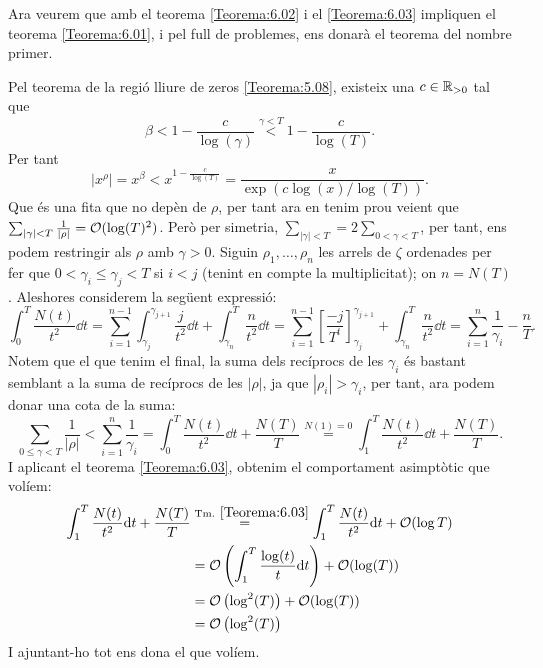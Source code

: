 Ara veurem que amb el teorema \ref{Teorema:6.02} i el \ref{Teorema:6.03} impliquen el teorema \ref{Teorema:6.01}, i pel full de problemes, ens donarà el teorema del nombre primer.
\begin{pf}
    Pel teorema de la regió lliure de zeros \ref{Teorema:5.08}, existeix una $c\in\mathbb R_{>0}$ tal que
    \[
        \beta<1-\frac{c}{\log(\gamma)}\overset{\gamma<T}{<}1-\frac{c}{\log(T)}.
    \]
    Per tant
    \[
        |x^\rho|=x^\beta<x^{1-\frac{c}{\log(T)}}=\frac{x}{\exp(c\log(x)/\log(T))}.
    \]
    Que és una fita que no depèn de $\rho$, per tant ara en tenim prou veient que $\sum_{|\gamma|<T}\frac{1}{|\rho|}=\mathcal O(\log(T)^2)$. Però per simetria, $\sum_{|\gamma|<T}=2\sum_{0<\gamma<T}$, per tant, ens podem restringir als $\rho$ amb $\gamma>0$. Siguin $\rho_1,\dots, \rho_n$ les arrels de $\zeta$ ordenades per fer que $0 < \gamma_i \leq \gamma_j < T$ si $i<j$ (tenint en compte la multiplicitat); on $n=N(T)$. Aleshores considerem la següent expressió:
    \[
        \int_0^T\frac{N(t)}{t^2}\dd t=\sum_{i=1}^{n-1}\int_{\gamma_j}^{\gamma_{j+1}}\frac{j}{t^2}\dd t+\int_{\gamma_n}^T\frac{n}{t^2}\dd t=
        \sum_{i=1}^{n-1}
        \left[
            \frac{-j}{T^t}
        \right]^{\gamma_{j+1}}_{\gamma_j}
        +\int_{\gamma_n}^T\frac{n}{t^2}\dd t=\sum_{i=1}^n\frac{1}{\gamma_i}-\frac{n}{T}.
    \]
    Notem que el que tenim el final, la suma dels recíprocs de les $\gamma_i$ és bastant semblant a la suma de recíprocs de les $|\rho|$, ja que $|\rho_i|>\gamma_i$, per tant, ara podem donar una cota de la suma:
    \[
        \sum_{0\leq \gamma<T}\frac{1}{|\rho|}<
        \sum_{i=1}^n\frac{1}{\gamma_i}=
        \int_{0}^{T}\frac{N(t)}{t^2}\dd t+\frac{N(T)}{T}\overset{N(1)=0}{=}
        \int_{1}^{T}\frac{N(t)}{t^2}\dd t+\frac{N(T)}{T}.
    \]
    I aplicant el teorema \ref{Teorema:6.03}, obtenim el comportament asimptòtic que volíem:
    \begin{align*}
        \int_{1}^{T}\frac{N(t)}{t^2}\mathrm{d} t+\frac{N(T)}{T}&\overset{\text{Tm. }\ref{Teorema:6.03}}{=\quad}
        \int_1^T\frac{N(t)}{t^2}\mathrm{d} t+\mathcal O(\log T)\\
        &=\mathcal O\left(\int_1^T\frac{\log(t)}{t}\mathrm{d} t\right)+\mathcal O(\log(T))\\
        &=\mathcal O\left(\log^2(T)\right)+\mathcal O(\log(T))\\
        &=\mathcal O\left(\log^2(T)\right)
    \end{align*}
    I ajuntant-ho tot ens dona el que volíem.
\end{pf}
